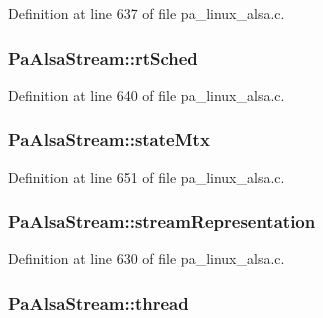Definition at line 637 of file pa\+\_\+linux\+\_\+alsa.\+c.

\subsubsection[{\texorpdfstring{rt\+Sched}{rtSched}}]{ Pa\+Alsa\+Stream\+::rt\+Sched}\hypertarget{struct_pa_alsa_stream_a950d643d1442448a51072e83debc40be}{}\label{struct_pa_alsa_stream_a950d643d1442448a51072e83debc40be}


Definition at line 640 of file pa\+\_\+linux\+\_\+alsa.\+c.

\subsubsection[{\texorpdfstring{state\+Mtx}{stateMtx}}]{ Pa\+Alsa\+Stream\+::state\+Mtx}\hypertarget{struct_pa_alsa_stream_aba5481778876188e52785adf8e0ce793}{}\label{struct_pa_alsa_stream_aba5481778876188e52785adf8e0ce793}


Definition at line 651 of file pa\+\_\+linux\+\_\+alsa.\+c.

\subsubsection[{\texorpdfstring{stream\+Representation}{streamRepresentation}}]{ Pa\+Alsa\+Stream\+::stream\+Representation}\hypertarget{struct_pa_alsa_stream_addaeac8fe364c5ff592d34c51102490f}{}\label{struct_pa_alsa_stream_addaeac8fe364c5ff592d34c51102490f}


Definition at line 630 of file pa\+\_\+linux\+\_\+alsa.\+c.

\subsubsection[{\texorpdfstring{thread}{thread}}]{ Pa\+Alsa\+Stream\+::thread}\hypertarget{struct_pa_alsa_stream_a78a3ab135792aa210042183dabab28ca}{}\label{struct_pa_alsa_stream_a78a3ab135792aa210042183dabab28ca}


